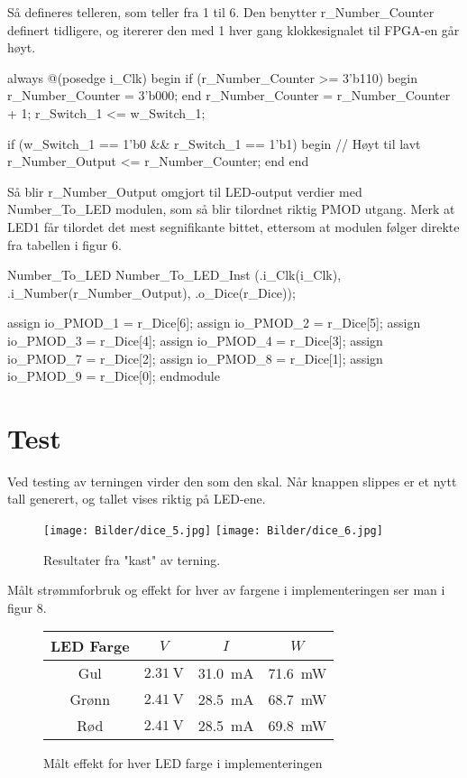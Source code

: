 Så defineres telleren, som teller fra 1 til 6. Den benytter r\_Number\_Counter definert tidligere,
og itererer den med 1 hver gang klokkesignalet til FPGA-en går høyt.
\begin{verilogcode}
always @(posedge i_Clk)
begin
    if (r_Number_Counter >= 3'b110) begin
        r_Number_Counter = 3'b000;
    end
    r_Number_Counter = r_Number_Counter + 1;
    r_Switch_1 <= w_Switch_1;
     
    if (w_Switch_1 == 1'b0 && r_Switch_1 == 1'b1) begin // Høyt til lavt
        r_Number_Output <= r_Number_Counter;
    end
end
\end{verilogcode}
Så blir r\_Number\_Output omgjort til LED-output verdier med Number\_To\_LED modulen, som så blir tilordnet 
riktig PMOD utgang. Merk at LED1 får tilordet det mest segnifikante bittet, ettersom at 
modulen følger direkte fra tabellen i figur 6.
\begin{verilogcode}
 Number_To_LED Number_To_LED_Inst
    (.i_Clk(i_Clk),
     .i_Number(r_Number_Output),
     .o_Dice(r_Dice));

 assign io_PMOD_1 = r_Dice[6];
 assign io_PMOD_2 = r_Dice[5];
 assign io_PMOD_3 = r_Dice[4];
 assign io_PMOD_4 = r_Dice[3];
 assign io_PMOD_7 = r_Dice[2];
 assign io_PMOD_8 = r_Dice[1];
 assign io_PMOD_9 = r_Dice[0];
endmodule    
\end{verilogcode}

\section{Test}
Ved testing av terningen virder den som den skal. Når knappen slippes er et nytt tall generert,
og tallet vises riktig på LED-ene.
\begin{figure}[H]
    \centering
    \texttt{[image: Bilder/dice\_5.jpg]}
    \texttt{[image: Bilder/dice\_6.jpg]}
    \caption{Resultater fra "kast" av terning.}
\end{figure}

Målt strømmforbruk og effekt for hver av fargene i implementeringen ser man i figur 8.

\begin{figure}[H]
    \centering
    \begin{tabular}{| c | c | c | c |} 
        \hline
        \textbf{LED Farge} & \textbf{$V$} & \textbf{$I$} & \textbf{$W$} \\ 
        \hline
        Gul & $\SI{2.31}{\volt}$ & \SI{31.0}{\milli\ampere} & \SI{71.6}{\milli\watt} \\ 
        \hline
        Grønn & $\SI{2.41}{\volt}$ & \SI{28.5}{\milli\ampere} & \SI{68.7}{\milli\watt} \\ 
        \hline
        Rød & $\SI{2.41}{\volt}$ & \SI{28.5}{\milli\ampere} & \SI{69.8}{\milli\watt} \\ 
        \hline
    \end{tabular}
    \caption{Målt effekt for hver LED farge i implementeringen}
\end{figure}

